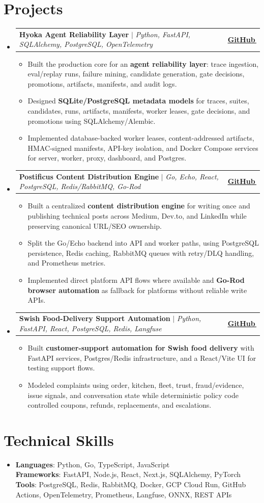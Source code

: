 \documentclass[letterpaper,11pt]{article}
\makeatletter
\newcommand{\bodyhref}[2]{\href{#1}{\underline{#2}\,\faExternalLink*}}
\newcommand{\resumeItem}[1]{\item{\fontsize{8.82pt}{9.28pt}\selectfont #1\vspace{-0.7pt}}}
\newcommand{\resumeProjectHeading}[2]{
    \item
    \begin{tabular*}{1.0\textwidth}{l@{\extracolsep{\fill}}r}
      \small#1 & \textbf{\small #2}\\
    \end{tabular*}\vspace{-4pt}
}
\newcommand{\resumeSubHeadingListStart}{\begin{itemize}[leftmargin=0.0in, label={}, itemsep=0.6pt, topsep=0pt, parsep=0pt, partopsep=0pt]}
\newcommand{\resumeSubHeadingListEnd}{\end{itemize}}
\newcommand{\resumeItemListStart}{\begin{itemize}[leftmargin=0.16in,itemsep=0.3pt,topsep=0.9pt,parsep=0pt,partopsep=0pt]}
\newcommand{\resumeItemListEnd}{\end{itemize}\vspace{-3pt}}
\makeatother
\begin{document}
\section{Projects}
\resumeSubHeadingListStart
\resumeProjectHeading
{\textbf{Hyoka Agent Reliability Layer} $|$ \emph{Python, FastAPI, SQLAlchemy, PostgreSQL, OpenTelemetry}}{\bodyhref{https://github.com/unichronic/hyoka}{GitHub}}
\resumeItemListStart
\resumeItem{Built the production core for an \textbf{agent reliability layer}: trace ingestion, eval/replay runs, failure mining, candidate generation, gate decisions, promotions, artifacts, manifests, and audit logs.}
\resumeItem{Designed \textbf{SQLite/PostgreSQL metadata models} for traces, suites, candidates, runs, artifacts, manifests, worker leases, gate decisions, and promotions using SQLAlchemy/Alembic.}
\resumeItem{Implemented database-backed worker leases, content-addressed artifacts, HMAC-signed manifests, API-key isolation, and Docker Compose services for server, worker, proxy, dashboard, and Postgres.}
\resumeItemListEnd
\resumeProjectHeading
{\textbf{Postificus Content Distribution Engine} $|$ \emph{Go, Echo, React, PostgreSQL, Redis/RabbitMQ, Go-Rod}}{\bodyhref{https://github.com/unichronic/postificus}{GitHub}}
\resumeItemListStart
\resumeItem{Built a centralized \textbf{content distribution engine} for writing once and publishing technical posts across Medium, Dev.to, and LinkedIn while preserving canonical URL/SEO ownership.}
\resumeItem{Split the Go/Echo backend into API and worker paths, using PostgreSQL persistence, Redis caching, RabbitMQ queues with retry/DLQ handling, and Prometheus metrics.}
\resumeItem{Implemented direct platform API flows where available and \textbf{Go-Rod browser automation} as fallback for platforms without reliable write APIs.}
\resumeItemListEnd
\resumeProjectHeading
{\textbf{Swish Food-Delivery Support Automation} $|$ \emph{Python, FastAPI, React, PostgreSQL, Redis, Langfuse}}{\bodyhref{https://github.com/unichronic/swishagent}{GitHub}}
\resumeItemListStart
\resumeItem{Built \textbf{customer-support automation for Swish food delivery} with FastAPI services, Postgres/Redis infrastructure, and a React/Vite UI for testing support flows.}
\resumeItem{Modeled complaints using order, kitchen, fleet, trust, fraud/evidence, issue signals, and conversation state while deterministic policy code controlled coupons, refunds, replacements, and escalations.}
\resumeItemListEnd
\resumeSubHeadingListEnd

\section{Technical Skills}
\begin{itemize}[leftmargin=0.15in, label={}, topsep=0pt, itemsep=0pt, parsep=0pt, partopsep=0pt]
  \item{\fontsize{9.0pt}{9.25pt}\selectfont
   \textbf{Languages}{: Python, Go, TypeScript, JavaScript} \\
   \textbf{Frameworks}{: FastAPI, Node.js, React, Next.js, SQLAlchemy, PyTorch} \\
   \textbf{Tools}{: PostgreSQL, Redis, RabbitMQ, Docker, GCP Cloud Run, GitHub Actions, OpenTelemetry, Prometheus, Langfuse, ONNX, REST APIs} \\
  }
\end{itemize}
\end{document}

